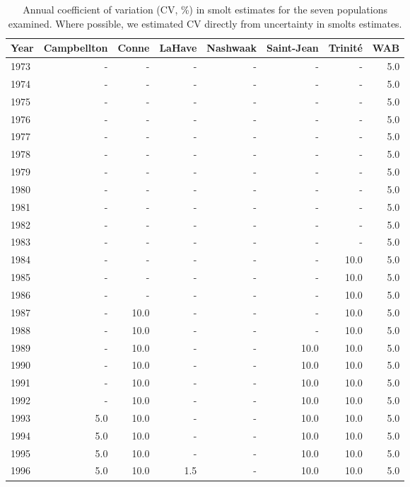 \begingroup\footnotesize
\begin{longtable}{lrrrrrrr}
\caption{Annual coefficient of variation (CV, \%) in smolt estimates for the seven populations
                    examined. Where possible, we estimated CV directly
                    from uncertainty in smolts estimates.} \\ 
  \hline
Year & Campbellton & Conne & LaHave & Nashwaak & Saint-Jean & Trinité & WAB \\ 
  \hline
1973 & - & - & - & - & - & - & 5.0 \\ 
  1974 & - & - & - & - & - & - & 5.0 \\ 
  1975 & - & - & - & - & - & - & 5.0 \\ 
  1976 & - & - & - & - & - & - & 5.0 \\ 
  1977 & - & - & - & - & - & - & 5.0 \\ 
  1978 & - & - & - & - & - & - & 5.0 \\ 
  1979 & - & - & - & - & - & - & 5.0 \\ 
  1980 & - & - & - & - & - & - & 5.0 \\ 
  1981 & - & - & - & - & - & - & 5.0 \\ 
  1982 & - & - & - & - & - & - & 5.0 \\ 
  1983 & - & - & - & - & - & - & 5.0 \\ 
  1984 & - & - & - & - & - & 10.0 & 5.0 \\ 
  1985 & - & - & - & - & - & 10.0 & 5.0 \\ 
  1986 & - & - & - & - & - & 10.0 & 5.0 \\ 
  1987 & - & 10.0 & - & - & - & 10.0 & 5.0 \\ 
  1988 & - & 10.0 & - & - & - & 10.0 & 5.0 \\ 
  1989 & - & 10.0 & - & - & 10.0 & 10.0 & 5.0 \\ 
  1990 & - & 10.0 & - & - & 10.0 & 10.0 & 5.0 \\ 
  1991 & - & 10.0 & - & - & 10.0 & 10.0 & 5.0 \\ 
  1992 & - & 10.0 & - & - & 10.0 & 10.0 & 5.0 \\ 
  1993 & 5.0 & 10.0 & - & - & 10.0 & 10.0 & 5.0 \\ 
  1994 & 5.0 & 10.0 & - & - & 10.0 & 10.0 & 5.0 \\ 
  1995 & 5.0 & 10.0 & - & - & 10.0 & 10.0 & 5.0 \\ 
  1996 & 5.0 & 10.0 & 1.5 & - & 10.0 & 10.0 & 5.0 \\ 

\end{longtable}

